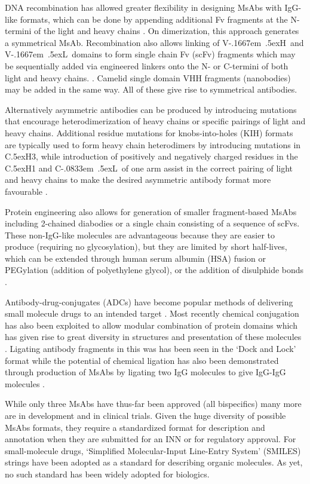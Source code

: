 \documentclass[a4]{article}
\newcommand{\VH}{\mbox{V\kern-.1667em \lower.5ex\hbox{\scriptsize H}}}
\newcommand{\VL}{\mbox{V\kern-.1667em \lower.5ex\hbox{\scriptsize L}}}
\newcommand{\CH}[1]{\mbox{C\lower.5ex\hbox{\scriptsize H}#1}}
\newcommand{\CL}{\mbox{C\kern-.0833em \lower.5ex\hbox{\scriptsize L}}}
\begin{document}
DNA recombination has allowed greater flexibility in designing MsAbs
with IgG-like formats, which can be done by appending additional Fv
fragments at the N-termini of the light and heavy chains
\cite{brinkmann:2017}. On dimerization, this approach generates a symmetrical MsAb.
Recombination also allows linking of \VH\ and \VL\ domains to
form single chain Fv (scFv) fragments
which may be sequentially added via engineered
linkers onto the N- or C-termini of both light and heavy chains.
\cite{legall:1999}. Camelid single domain VHH fragments (nanobodies)
may be added in the same way. All of these give rise to symmetrical antibodies.

Alternatively asymmetric antibodies can be produced by introducing mutations
that encourage heterodimerization of heavy chains or specific pairings of light and heavy chains.
Additional residue mutations for knobs-into-holes (KIH)
formats \cite{ridgway:1996} are typically used to form heavy chain heterodimers
by introducing mutations in \CH{3},
while introduction of positively and negatively
charged residues in the \CH{1} and \CL\ of one arm \cite{gunasekaran:2010} assist in the correct
pairing of light and heavy chains to make the desired asymmetric antibody format more favourable
\cite{spiess:2015}.   

Protein engineering also allows for generation of 
smaller fragment-based MsAbs including 2-chained diabodies or a single
chain consisting of a sequence of scFvs.
These non-IgG-like molecules are
advantageous because they are easier to produce (requiring no glycosylation),
but they are limited by short
half-lives, which can be extended through human serum albumin (HSA)
fusion or PEGylation (addition of polyethylene glycol), or the addition of
disulphide bonds \cite{kontermann:2011,ma:2021}. 

Antibody-drug-conjugates (ADCs) have become
popular methods of delivering small molecule drugs to an intended
target \cite{sau:2017}. Most recently chemical conjugation has also been exploited to allow modular combination of protein domains which
has given rise to great diversity in structures and presentation of
these molecules \cite{spiess:2015}. Ligating antibody
fragments in this was has been seen in the `Dock and Lock' format
while the potential of chemical ligation
has also been demonstrated through production of MsAbs by ligating two IgG molecules to
give IgG-IgG molecules \cite{szijj:2021}.  

While only three MsAbs have thus-far been approved (all bispecifics)
many more are in development and in clinical trials.
Given the huge diversity of possible MsAbs formats, they require a
standardized format for description and annotation when they are
submitted for an INN or for regulatory approval. For small-molecule drugs,
`Simplified Molecular-Input Line-Entry System' (SMILES) strings 
\cite{weininger:smiles} have been adopted as a standard for describing
organic molecules. As yet, no such standard has been widely adopted for biologics.
\end{document}
